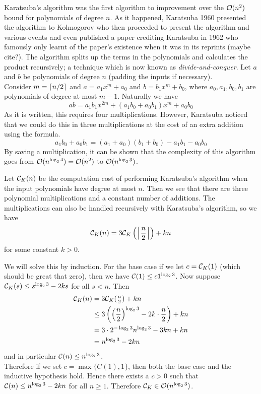 Karatsuba's algorithm was the first algorithm to improvement over the $\mathcal O(n^2)$ bound for polynomials of degree $n$. As it happened, Karatsuba 1960 presented the algorithm to Kolmogorov who then proceeded to present the algorithm and various events and even published a paper crediting Karatsuba in 1962 \cite{karatsuba} who famously only learnt of the paper's existence when it was in its reprints (maybe cite?). The algorithm splits up the terms in the polynomials and calculates the product recursively; a technique which is now known as \emph{divide-and-conquer}. Let $a$ and $b$ be polynomials of degree $n$ (padding the inputs if necessary).\\
Consider $m = \left \lceil n/2 \right \rceil$ and $a = a_1x^m + a_0$ and $b = b_1x^m + b_0$, where $a_0, a_1, b_0, b_1$ are polynomials of degree at most $m - 1$. Naturally we have
\[
    ab = a_1b_1x^{2m} + (a_1b_0 + a_0b_1)x^m + a_0b_0
\]
As it is written, this requires four multiplications. However, Karatsuba noticed that we could do this in three multiplications at the cost of an extra addition using the formula.
\[
    a_1b_0 + a_0b_1 = (a_1 + a_0)(b_1 + b_0) - a_1b_1 - a_0b_0
\]
By saving a multiplication, it can be shown that the complexity of this algorithm goes from $\mathcal O(n^{\log_2 4}) = \mathcal O(n^2)$ to $\mathcal O(n^{\log_2 3})$.

Let $\mathcal C_K(n)$ be the computation cost of performing Karatsuba's algorithm when the input polynomials have degree at most $n$. Then we see that there are three polynomial multiplications and a constant number of additions. The multiplications can also be handled recursively with Karatsuba's algorithm, so we have
\[
    \mathcal C_K(n) = 3\mathcal C_K\left(\left \lceil \frac{n}{2} \right \rceil\right) + kn
\]
for some constant $k > 0$.

We will solve this by induction.
For the base case if we let $c = \mathcal C_K(1)$ (which should be great that zero), then we have $\mathcal C(1) \le c1^{\log_2 3}$.
Now suppose $\mathcal C_K(s) \le s^{\log_2 3} - 2ks$ for all $s < n$. Then
\begin{align*}
    \mathcal C_K(n) &= 3\mathcal C_K(\tfrac{n}{2}) + kn\\
               &\le 3\left(\left(\frac{n}{2}\right)^{\log_2 3} - 2k \cdot \frac{n}{2}\right) + kn\\
               &= 3 \cdot 2^{-\log_2 3}n^{\log_2 3} - 3kn + kn\\
               &= n^{\log_2 3} - 2kn
\end{align*}
and in particular $\mathcal C(n) \le n^{\log_2 3}$.\\
Therefore if we set $c = \max\{C(1), 1\}$, then both the base case and the inductive hypothesis hold. Hence there exists a $c > 0$ such that $\mathcal C(n) \le n^{\log_2 3} - 2kn$ for all $n \ge 1$.
Therefore $\mathcal C_K \in \mathcal O(n^{\log_2 3})$.

